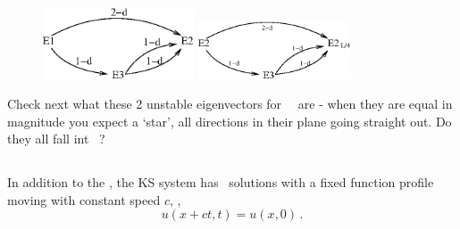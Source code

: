 \begin{figure}[t] \label{f:KS22cage}
\begin{center}
\includegraphics[width=0.4\textwidth]{figs/ks22_E1_UM_diag.eps}
\includegraphics[width=0.4\textwidth]{figs/ks22_E2_UM_diag.eps}
\end{center}
\caption{
        }
\end{figure}



Check next what these 2 unstable eigenvectors for ~\eqv\ are - when they
are equal in magnitude you expect a `star', all directions in their plane
going straight out. Do they all fall int ~\eqv?

\subsection{\Reqva}

In addition to the \eqva, the KS system has \reqv\ solutions 
 with a fixed function profile
moving with constant speed $c$, \ie,
\[ u(x+ct,t) = u(x, 0)\,.
\]

